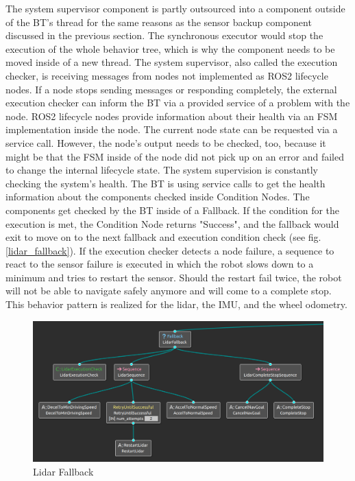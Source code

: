 The system supervisor component is partly outsourced into a component outside of the BT's thread for the same reasons as the sensor backup component discussed in the previous section. The synchronous executor would stop the execution of the whole behavior tree, which is why the component needs to be moved inside of a new thread. The system supervisor, also called the execution checker, is receiving messages from nodes not implemented as ROS2 lifecycle nodes. If a node stops sending messages or responding completely, the external execution checker can inform the BT via a provided service of a problem with the node. ROS2 lifecycle nodes provide information about their health via an FSM implementation inside the node. The current node state can be requested via a service call. However, the node's output needs to be checked, too, because it might be that the FSM inside of the node did not pick up on an error and failed to change the internal lifecycle state. 
The system supervision is constantly checking the system's health. The BT is using service calls to get the health information about the components checked inside Condition Nodes. 
The components get checked by the BT inside of a Fallback. If the condition for the execution is met, the Condition Node returns "Success", and the fallback would exit to move on to the next fallback and execution condition check (see fig. \ref{lidar_fallback}). If the execution checker detects a node failure, a sequence to react to the sensor failure is executed in which the robot slows down to a minimum and tries to restart the sensor. Should the restart fail twice, the robot will not be able to navigate safely anymore and will come to a complete stop. This behavior pattern is realized for the lidar, the IMU, and the wheel odometry. 

\begin{figure}[ht]
	\includegraphics[width=1.0\textwidth]{images/sensor_fallback.png}
	\caption{Lidar Fallback}
	\label{fig:lidar_fallback}
\end{figure}

